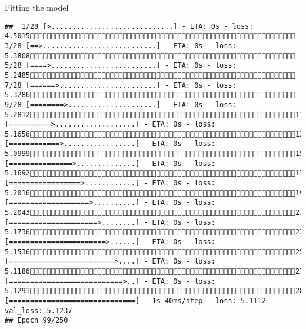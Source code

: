 \documentclass[
  ignorenonframetext,
]{beamer}
\begin{document}
\begin{frame}[fragile]{Fitting the model}
\begin{verbatim}
##  1/28 [>.............................] - ETA: 0s - loss: 4.5015 3/28 [==>...........................] - ETA: 0s - loss: 5.3808 5/28 [====>.........................] - ETA: 0s - loss: 5.2485 7/28 [======>.......................] - ETA: 0s - loss: 5.3286 9/28 [========>.....................] - ETA: 0s - loss: 5.281211/28 [==========>...................] - ETA: 0s - loss: 5.165613/28 [============>.................] - ETA: 0s - loss: 5.099915/28 [===============>..............] - ETA: 0s - loss: 5.169217/28 [=================>............] - ETA: 0s - loss: 5.201619/28 [===================>..........] - ETA: 0s - loss: 5.204321/28 [=====================>........] - ETA: 0s - loss: 5.173623/28 [=======================>......] - ETA: 0s - loss: 5.153625/28 [=========================>....] - ETA: 0s - loss: 5.118627/28 [===========================>..] - ETA: 0s - loss: 5.129128/28 [==============================] - 1s 40ms/step - loss: 5.1112 - val_loss: 5.1237
## Epoch 99/250

\end{verbatim}
\end{frame}
\end{document}
